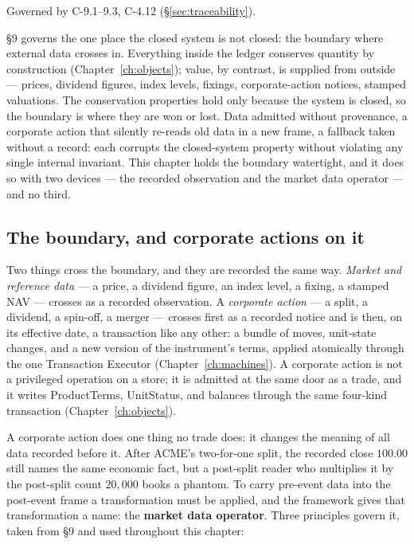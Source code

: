 \documentclass[11pt,a4paper]{article}
\begin{document}
Governed by C-9.1--9.3, C-4.12 (\S\ref{sec:traceability}).

\S 9 governs the one place the closed system is not closed: the boundary where external
data crosses in. Everything inside the ledger conserves quantity by construction
(Chapter~\ref{ch:objects}); value, by contrast, is supplied from outside --- prices,
dividend figures, index levels, fixings, corporate-action notices, stamped valuations.
The conservation properties hold only because the system is closed, so the boundary is
where they are won or lost. Data admitted without provenance, a corporate action that
silently re-reads old data in a new frame, a fallback taken without a record: each
corrupts the closed-system property without violating any single internal invariant. This
chapter holds the boundary watertight, and it does so with two devices --- the recorded
observation and the market data operator --- and no third.

\subsection{The boundary, and corporate actions on it}

Two things cross the boundary, and they are recorded the same way. \emph{Market and
reference data} --- a price, a dividend figure, an index level, a fixing, a stamped NAV
--- crosses as a recorded observation. A \emph{corporate action} --- a split, a dividend,
a spin-off, a merger --- crosses first as a recorded notice and is then, on its effective
date, a transaction like any other: a bundle of moves, unit-state changes, and a new
version of the instrument's terms, applied atomically through the one Transaction Executor
(Chapter~\ref{ch:machines}). A corporate action is not a privileged operation on a store;
it is admitted at the same door as a trade, and it writes ProductTerms, UnitStatus, and
balances through the same four-kind transaction (Chapter~\ref{ch:objects}).

A corporate action does one thing no trade does: it changes the meaning of all data
recorded before it. After ACME's two-for-one split, the recorded close $100.00$ still
names the same economic fact, but a post-split reader who multiplies it by the post-split
count $20{,}000$ books a phantom. To carry pre-event data into the post-event frame a
transformation must be applied, and the framework gives that transformation a name: the
\textbf{market data operator}. Three principles govern it, taken from \S 9 and used
throughout this chapter:
\end{document}

